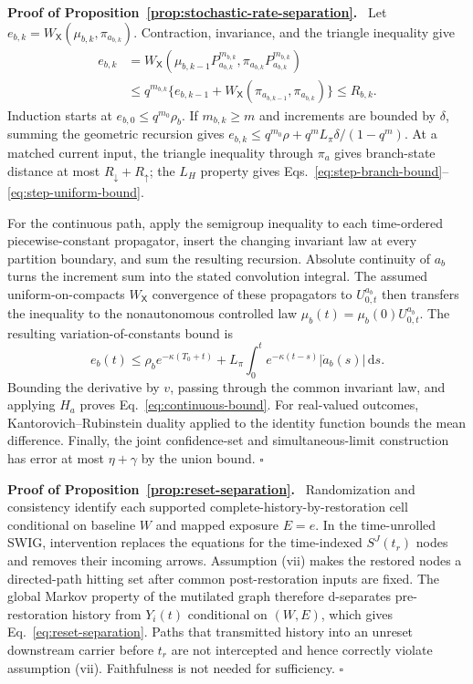 \documentclass[10pt,a4paper]{article}
\newcommand{\dd}{\mathrm{d}}
\newcommand{\inlinehead}[1]{\par\smallskip\noindent\textbf{#1}\ }
\begin{document}
\begin{appendices}
\inlinehead{Proof of Proposition~\ref{prop:stochastic-rate-separation}.} Let $e_{b,k}=W_{\mathsf X}(\mu_{b,k},\pi_{a_{b,k}})$. Contraction, invariance, and the triangle inequality give
\begin{align}
e_{b,k}
&=W_{\mathsf X}(\mu_{b,k-1}P_{a_{b,k}}^{m_{b,k}},
\pi_{a_{b,k}}P_{a_{b,k}}^{m_{b,k}})\\
&\le q^{m_{b,k}}
\{e_{b,k-1}+W_{\mathsf X}(\pi_{a_{b,k-1}},\pi_{a_{b,k}})\}
\le R_{b,k}.
\end{align}
Induction starts at $e_{b,0}\le q^{m_0}\rho_b$. If $m_{b,k}\ge m$ and increments are bounded by $\delta$, summing the geometric recursion gives $e_{b,k}\le q^{m_0}\rho+q^mL_\pi\delta/(1-q^m)$. At a matched current input, the triangle inequality through $\pi_a$ gives branch-state distance at most $R_\downarrow+R_\uparrow$; the $L_H$ property gives Eqs.~\eqref{eq:step-branch-bound}--\eqref{eq:step-uniform-bound}.

For the continuous path, apply the semigroup inequality to each time-ordered piecewise-constant propagator, insert the changing invariant law at every partition boundary, and sum the resulting recursion. Absolute continuity of $a_b$ turns the increment sum into the stated convolution integral. The assumed uniform-on-compacts $W_{\mathsf X}$ convergence of these propagators to $U_{0,t}^{a_b}$ then transfers the inequality to the nonautonomous controlled law $\mu_b(t)=\mu_b(0)U_{0,t}^{a_b}$. The resulting variation-of-constants bound is
\begin{equation}
e_b(t)\le \rho_b e^{-\kappa(T_0+t)}
+L_\pi\int_0^t e^{-\kappa(t-s)}|\dot a_b(s)|\,\dd s.
\end{equation}
Bounding the derivative by $v$, passing through the common invariant law, and applying $H_a$ proves Eq.~\eqref{eq:continuous-bound}. For real-valued outcomes, Kantorovich--Rubinstein duality applied to the identity function bounds the mean difference. Finally, the joint confidence-set and simultaneous-limit construction has error at most $\eta+\gamma$ by the union bound. \hfill$\square$

\inlinehead{Proof of Proposition~\ref{prop:reset-separation}.} Randomization and consistency identify each supported complete-history-by-restoration cell conditional on baseline $W$ and mapped exposure $E=e$. In the time-unrolled SWIG, intervention replaces the equations for the time-indexed $S^J(t_r)$ nodes and removes their incoming arrows. Assumption (vii) makes the restored nodes a directed-path hitting set after common post-restoration inputs are fixed. The global Markov property of the mutilated graph therefore d-separates pre-restoration history from $Y_i(t)$ conditional on $(W,E)$, which gives Eq.~\eqref{eq:reset-separation}. Paths that transmitted history into an unreset downstream carrier before $t_r$ are not intercepted and hence correctly violate assumption (vii). Faithfulness is not needed for sufficiency. \hfill$\square$


\end{appendices}
\end{document}

